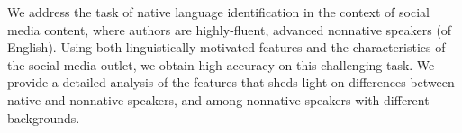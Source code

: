 We address the task of native language identification in the context of social media content, where authors are highly-fluent, advanced nonnative speakers (of English). Using both linguistically-motivated features and the characteristics of the social media outlet, we obtain high accuracy on this challenging task. We provide a detailed analysis of the features that sheds light on differences between native and nonnative speakers, and among nonnative speakers with different backgrounds.
